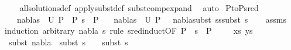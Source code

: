 \begin{isabellebody}
%
\isadelimproof
\ \ %
\endisadelimproof
%
\isatagproof
{}\isamarkupfalse%
\ all{\isacharunderscore}{\kern0pt}solutions{\isacharunderscore}{\kern0pt}def\ apply{\isacharunderscore}{\kern0pt}subst{\isacharunderscore}{\kern0pt}def\ subst{\isacharunderscore}{\kern0pt}comp{\isacharunderscore}{\kern0pt}expand\ \isamarkupfalse%
\ auto%
\endisatagproof
{\isafoldproof}%
%
\isadelimproof
\isanewline
%
\endisadelimproof
\isanewline
\isanewline
\isanewline
{}\isamarkupfalse%
\ P{}{\isacharunderscore}{\kern0pt}to{\isacharunderscore}{\kern0pt}P{}{\isacharunderscore}{\kern0pt}sred{\isacharcolon}{\kern0pt}\isanewline
\ \ \ {\isachardoublequoteopen}{\isacharparenleft}{\kern0pt}nabla{}{\isacharcomma}{\kern0pt}s{}{\isacharparenright}{\kern0pt}\ {\isasymin}\ U\ P{}{\isachardoublequoteclose}\ \ {\isachardoublequoteopen}P{}\ {\isasymturnstile}s{}\ {\isasymleadsto}\ P{}{\isachardoublequoteclose}\isanewline
\ \ \ {\isachardoublequoteopen}{\isacharparenleft}{\kern0pt}nabla{}{\isacharcomma}{\kern0pt}s{}{\isacharparenright}{\kern0pt}\ {\isasymin}\ U\ P{}\ \ {\isasymand}\ {\isacharparenleft}{\kern0pt}nabla{}{\isasymTurnstile}subst\ {\isacharparenleft}{\kern0pt}s{}{\isasymbullet}s{}{\isacharparenright}{\kern0pt}{\isasymapprox}subst\ s{}{\isacharparenright}{\kern0pt}{\isachardoublequoteclose}\isanewline
%
\isadelimproof
\ \ %
\endisadelimproof
%
\isatagproof
{}\isamarkupfalse%
\ assms\isanewline
{}\isamarkupfalse%
{\isacharparenleft}{\kern0pt}induction\ arbitrary{\isacharcolon}{\kern0pt}\ nabla{}\ s{}\ rule{\isacharcolon}{\kern0pt}\ s{\isacharunderscore}{\kern0pt}red{\isachardot}{\kern0pt}induct{\isacharbrackleft}{\kern0pt}OF\ {\isacartoucheopen}P{}\ {\isasymturnstile}\ s{}\ {\isasymleadsto}\ P{}{\isacartoucheclose}{\isacharbrackright}{\kern0pt}{\isacharparenright}{\kern0pt}\isanewline
\ \ \isamarkupfalse%
\ {\isacharparenleft}{\kern0pt}{}\ xs\ ys{\isacharparenright}{\kern0pt}\isanewline
\ \ \ \isamarkupfalse%
\ \isamarkupfalse%
\ subst{\isacharcolon}{\kern0pt}\ {\isachardoublequoteopen}nabla{}\ {\isasymTurnstile}\ subst\ {\isacharparenleft}{\kern0pt}s{}\ {\isasymbullet}\ {\isacharbrackleft}{\kern0pt}{\isacharbrackright}{\kern0pt}{\isacharparenright}{\kern0pt}\ {\isasymapprox}\ subst\ s{}{\isachardoublequoteclose}\ \isanewline

\end{isabellebody}

